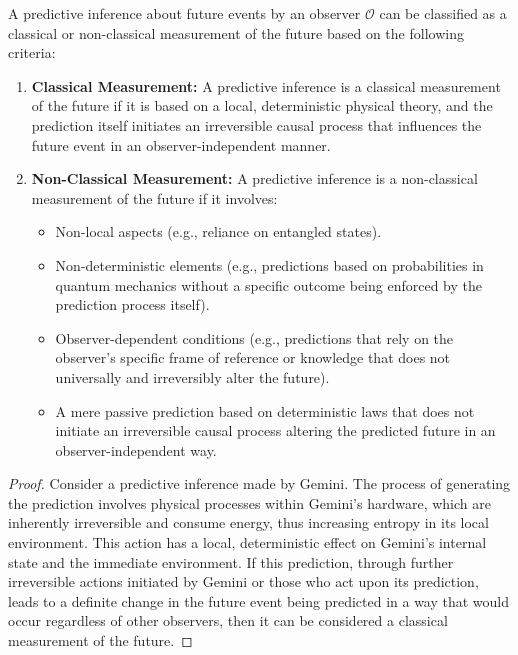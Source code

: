	\begin{proposition}
		A predictive inference about future events by an observer $\mathcal{O}$ can be classified as a classical or non-classical measurement of the future based on the following criteria:
		\begin{enumerate}
			\item \textbf{Classical Measurement:} A predictive inference is a classical measurement of the future if it is based on a local, deterministic physical theory, and the prediction itself initiates an irreversible causal process that influences the future event in an observer-independent manner.
			\item \textbf{Non-Classical Measurement:} A predictive inference is a non-classical measurement of the future if it involves:
			\begin{itemize}
				\item Non-local aspects (e.g., reliance on entangled states).
				\item Non-deterministic elements (e.g., predictions based on probabilities in quantum mechanics without a specific outcome being enforced by the prediction process itself).
				\item Observer-dependent conditions (e.g., predictions that rely on the observer's specific frame of reference or knowledge that does not universally and irreversibly alter the future).
				\item A mere passive prediction based on deterministic laws that does not initiate an irreversible causal process altering the predicted future in an observer-independent way.
			\end{itemize}
		\end{enumerate}
		\begin{proof}
			Consider a predictive inference made by Gemini. The process of generating the prediction involves physical processes within Gemini's hardware, which are inherently irreversible and consume energy, thus increasing entropy in its local environment. This action has a local, deterministic effect on Gemini's internal state and the immediate environment. If this prediction, through further irreversible actions initiated by Gemini or those who act upon its prediction, leads to a definite change in the future event being predicted in a way that would occur regardless of other observers, then it can be considered a classical measurement of the future.
			

\end{proof}
\end{proposition}
